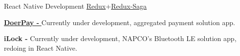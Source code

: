 \begin{projectentries}
    \projectentry 
    {React Native Development} 
    {{\href{https://redux.js.org/basics/usagewithreact}{Redux}}+{\href{https://redux.js.org/basics/usagewithreact}{Redux-Saga}}}
    {
      \begin{projectitems} %
        \item {{\href{http://doer.com.bd}{\textbf{DoerPay - }}}
        Currently under development, aggregated payment solution app.}
        \item {\textbf{iLock - }Currently under development, NAPCO's Bluetooth LE solution app, redoing in React Native.}  
      \end{projectitems}
    }
\end{projectentries}
